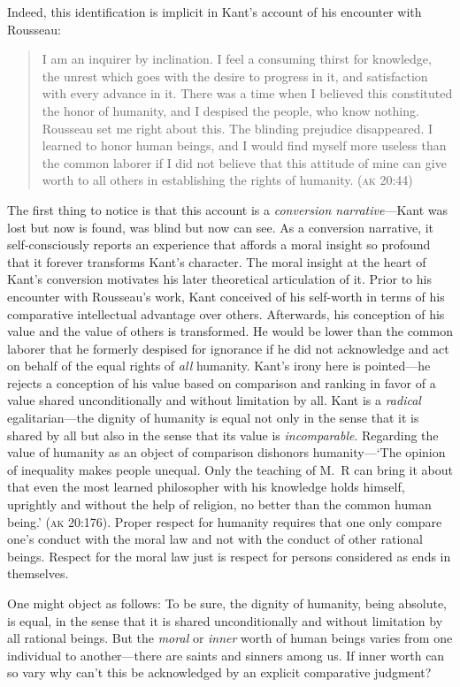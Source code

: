 \documentclass[a4paper,12pt]{article}
\begin{document}
Indeed, this identification is implicit in Kant's account of his encounter with Rousseau: 
\begin{quote}
	I am an inquirer by inclination. I feel a consuming thirst for knowledge, the unrest which goes with the desire to progress in it, and satisfaction with every advance in it. There was a time when I believed this constituted the honor of humanity, and I despised the people, who know nothing. Rousseau set me right about this. The blinding prejudice disappeared. I learned to honor human beings, and I would find myself more useless than the common laborer if I did not believe that this attitude of mine can give worth to all others in establishing the rights of humanity. (\textsc{ak} 20:44) 
\end{quote}
The first thing to notice is that this account is a \emph{conversion narrative}---Kant was lost but now is found, was blind but now can see. As a conversion narrative, it self-consciously reports an experience that affords a moral insight so profound that it forever transforms Kant's character. The moral insight at the heart of Kant's conversion motivates his later theoretical articulation of it. Prior to his encounter with Rousseau's work, Kant conceived of his self-worth in terms of his comparative intellectual advantage over others. Afterwards, his conception of his value and the value of others is transformed. He would be lower than the common laborer that he formerly despised for ignorance if he did not acknowledge and act on behalf of the equal rights of \emph{all} humanity. Kant's irony here is pointed---he rejects a conception of his value based on comparison and ranking in favor of a value shared unconditionally and without limitation by all. Kant is a \emph{radical} egalitarian---the dignity of humanity is equal not only in the sense that it is shared by all but also in the sense that its value is \emph{incomparable}. Regarding the value of humanity as an object of comparison dishonors humanity---`The opinion of inequality makes people unequal. Only the teaching of M.\ R can bring it about that even the most learned philosopher with his knowledge holds himself, uprightly and without the help of religion, no better than the common human being.' (\textsc{ak} 20:176). Proper respect for humanity requires that one only compare one's conduct with the moral law and not with the conduct of other rational beings. Respect for the moral law just is respect for persons considered as ends in themselves.

One might object as follows: To be sure, the dignity of humanity, being absolute, is equal, in the sense that it is shared unconditionally and without limitation by all rational beings. But the \emph{moral} or \emph{inner} worth of human beings varies from one individual to another---there are saints and sinners among us. If inner worth can so vary why can't this be acknowledged by an explicit comparative judgment?
\end{document}
